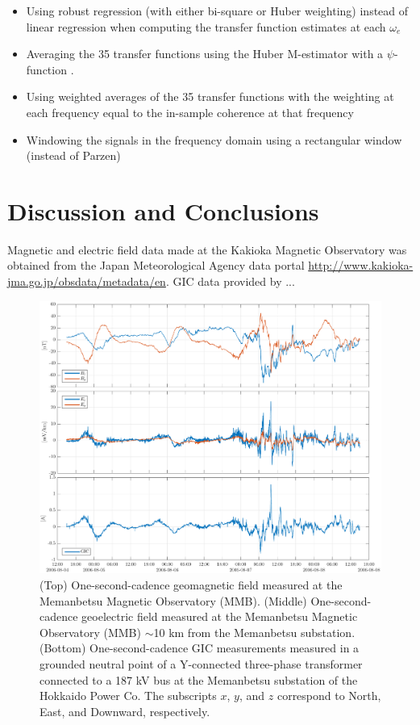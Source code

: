 \documentclass[draft,linenumbers]{agujournal2018}
\begin{document}
\begin{itemize}
\item Using robust regression (with either bi-square or Huber weighting) instead of linear regression when computing the transfer function estimates at each $\omega_e$

\item Averaging the 35 transfer functions using the Huber M-estimator with a $\psi$-function \citep{Huber2011}. 

\item Using weighted averages of the 35 transfer functions with the weighting at each frequency equal to the in-sample coherence at that frequency

\item Windowing the signals in the frequency domain using a rectangular window (instead of Parzen)
\end{itemize}

\section{Discussion and Conclusions}


\acknowledgments
Magnetic and electric field data made at the Kakioka Magnetic Observatory was obtained from the Japan Meteorological Agency data portal \url{http://www.kakioka-jma.go.jp/obsdata/metadata/en}. GIC data provided by ...




\clearpage

\begin{figure}[h]
\centering
\includegraphics[width=\textwidth]{figures/plot_raw_All_20060805.pdf}
\caption{(Top) One-second-cadence geomagnetic field measured at the Memanbetsu Magnetic Observatory (MMB). (Middle) One-second-cadence geoelectric field measured at the Memanbetsu Magnetic Observatory (MMB) $\sim$10 km from the Memanbetsu substation. (Bottom) One-second-cadence GIC measurements measured in a grounded neutral point of a Y-connected three-phase transformer connected to a 187 kV bus at the Memanbetsu substation of the Hokkaido Power Co. The subscripts $x$, $y$, and $z$ correspond to North, East, and Downward, respectively.}
\label{sample}
\end{figure}
\end{document}
